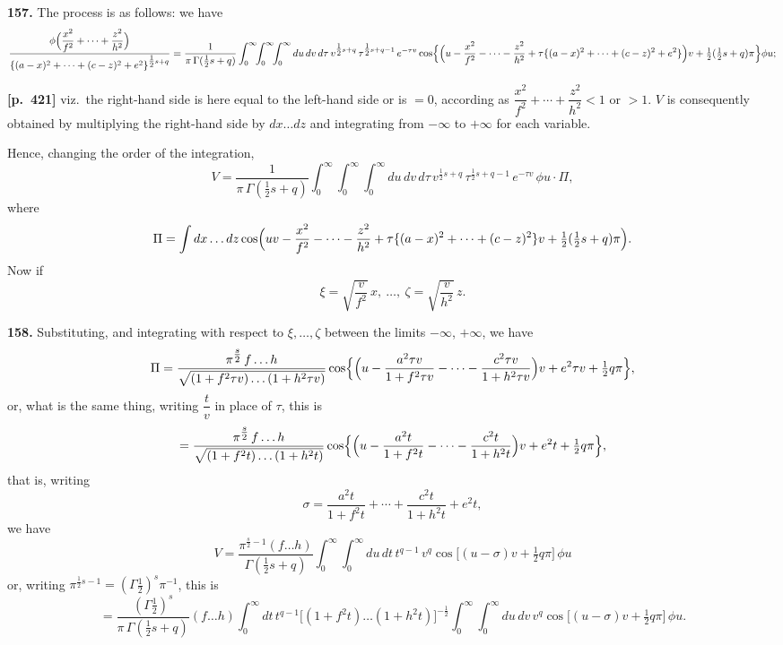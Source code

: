 \documentclass[11pt,a4paper]{article}
\begin{document}
\textbf{157.} The process is as follows: we have
\[
\frac{\phi\Bigl(\dfrac{x^{2}}{f^{2}} + \cdots + \dfrac{z^{2}}{h^{2}}\Bigr)}{\{(a-x)^{2}+\cdots+(c-z)^{2}+e^{2}\}^{\tfrac{1}{2}s+q}} = \frac{1}{\pi\,\Gamma(\tfrac{1}{2}s+q)}\int_{0}^{\infty}\!\!\int_{0}^{\infty}\!\!\int_{0}^{\infty} du\,dv\,d\tau\,v^{\tfrac{1}{2}s+q}\,\tau^{\tfrac{1}{2}s+q-1}\,e^{-\tau v}\cos\Bigl\{\Bigl(u - \frac{x^{2}}{f^{2}} - \cdots - \frac{z^{2}}{h^{2}} + \tau\{(a-x)^{2}+\cdots+(c-z)^{2}+e^{2}\}\Bigr)v + \tfrac{1}{2}(\tfrac{1}{2}s+q)\pi\Bigr\}\phi u;
\]

\bigskip
\noindent\textbf{[p.~421]}\quad
viz.\ the right-hand side is here equal to the left-hand side or is $= 0$, according as $\dfrac{x^{2}}{f^{2}} + \cdots + \dfrac{z^{2}}{h^{2}} < 1$ or $> 1$. $V$ is consequently obtained by multiplying the right-hand side by $dx\ldots dz$ and integrating from $-\infty$ to $+\infty$ for each variable.

Hence, changing the order of the integration,
\[
V = \frac{1}{\pi\,\Gamma(\tfrac{1}{2}s+q)}\int_{0}^{\infty}\!\!\int_{0}^{\infty}\!\!\int_{0}^{\infty} du\,dv\,d\tau\,v^{\tfrac{1}{2}s+q}\,\tau^{\tfrac{1}{2}s+q-1}\,e^{-\tau v}\,\phi u\cdot\Pi,
\]
where
\[
\Pi = \int dx\ldots dz\cos\Bigl(uv - \frac{x^{2}}{f^{2}} - \cdots - \frac{z^{2}}{h^{2}} + \tau\{(a-x)^{2}+\cdots+(c-z)^{2}\}v + \tfrac{1}{2}(\tfrac{1}{2}s+q)\pi\Bigr).
\]
Now if
\[
\xi = \sqrt{\dfrac{v}{f^{2}}}\,x,\ \ldots,\ \zeta = \sqrt{\dfrac{v}{h^{2}}}\,z.
\]

\textbf{158.} Substituting, and integrating with respect to $\xi,\ldots,\zeta$ between the limits $-\infty$, $+\infty$, we have
\[
\Pi = \frac{\pi^{\tfrac{s}{2}}\,f\ldots h}{\sqrt{(1+f^{2}\tau v)\ldots(1+h^{2}\tau v)}}\cos\Bigl\{\Bigl(u - \frac{a^{2}\tau v}{1+f^{2}\tau v} - \cdots - \frac{c^{2}\tau v}{1+h^{2}\tau v}\Bigr)v + e^{2}\tau v + \tfrac{1}{2}q\pi\Bigr\},
\]
or, what is the same thing, writing $\dfrac{t}{v}$ in place of $\tau$, this is
\[
= \frac{\pi^{\tfrac{s}{2}}\,f\ldots h}{\sqrt{(1+f^{2}t)\ldots(1+h^{2}t)}}\cos\Bigl\{\Bigl(u - \frac{a^{2}t}{1+f^{2}t} - \cdots - \frac{c^{2}t}{1+h^{2}t}\Bigr)v + e^{2}t + \tfrac{1}{2}q\pi\Bigr\},
\]
that is, writing
\[
\sigma = \frac{a^{2}t}{1+f^{2}t} + \cdots + \frac{c^{2}t}{1+h^{2}t} + e^{2}t,
\]
we have
\[
V = \frac{\pi^{\tfrac{s}{2}-1}(f\ldots h)}{\Gamma(\tfrac{1}{2}s+q)}\int_{0}^{\infty}\!\!\int_{0}^{\infty} du\,dt\,t^{q-1}\,v^{q}\cos\bigl[(u-\sigma)v + \tfrac{1}{2}q\pi\bigr]\,\phi u
\]
or, writing $\pi^{\tfrac{1}{2}s-1} = (\Gamma\tfrac{1}{2})^{s}\pi^{-1}$, this is
\[
= \frac{(\Gamma\tfrac{1}{2})^{s}}{\pi\,\Gamma(\tfrac{1}{2}s+q)}(f\ldots h)\int_{0}^{\infty} dt\,t^{q-1}\bigl[(1+f^{2}t)\ldots(1+h^{2}t)\bigr]^{-\tfrac{1}{2}}\int_{0}^{\infty}\!\!\int_{0}^{\infty} du\,dv\,v^{q}\cos\bigl[(u-\sigma)v + \tfrac{1}{2}q\pi\bigr]\,\phi u.
\]
\end{document}
